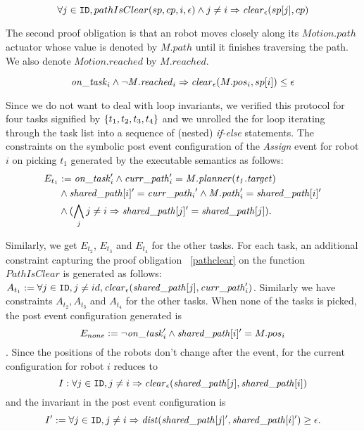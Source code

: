 \begin{proofob}
    \label{pathclear}
    $$\forall j \in \texttt{ID}, \mathit\mathit{pathIsClear}(sp, cp,  i, \epsilon) \wedge j \neq i \Rightarrow \mathit{clear}_\epsilon(sp[j], cp)$$
\end{proofob}


The second proof obligation is that an robot moves closely along its $\mathit{Motion.path}$ actuator whose value is denoted by $\mathit{M.path}$ until it finishes traversing the path. We also denote $\mathit{Motion.reached}$ by $\mathit{M.reached}$.
\begin{proofob}
        \label{stlinemotion}
    $$\mathit{on\_task}_i\wedge \neg \mathit{M.reached}_i \Rightarrow \mathit{clear}_\epsilon(M.pos_i, sp[i]) \leq \epsilon $$
\end{proofob}

Since we do not want to deal with loop invariants, we verified this protocol for four tasks signified by $\left\{t_1,t_2,t_3,t_4\right\}$ and we unrolled the for loop iterating through the task list into a sequence of (nested) \emph{if-else} statements. The constraints on the symbolic post event configuration of the \emph{Assign} event for robot $i$ on picking $t_1$ generated by the \K executable semantics as follows: \begin{align*}E_{t_1} &:= \mathit{on\_task}_i' \wedge \mathit{curr\_path}_i' = \mathit{M.planner(t_1.target)} \\ &\wedge \mathit{shared\_path}[i]' = \mathit{curr\_path_i}' \wedge \mathit{M.path}_i' = \mathit{shared\_path}[i]' \\
  &\wedge (\bigwedge_j j\neq i \Rightarrow \mathit{shared\_path}[j]'= \mathit{shared\_path}[j]).
 \end{align*}

Similarly, we get $E_{t_2}$, $E_{t_3}$ and $E_{t_4}$ for the other tasks. For each task, an additional constraint capturing the proof obligation ~\ref{pathclear} on the function $\mathit{PathIsClear}$ is generated as follows:  $A_{t_1} := \forall j \in \texttt{ID}, j \neq id, \mathit{clear}_\epsilon(\mathit{shared\_path}[j], \mathit{curr\_path}_i')$. Similarly we have constraints $A_{t_2}, A_{t_3}$  and $A_{t_4}$ for the other tasks. When none of the tasks is picked, the post event configuration generated is $$ E_{none} :=\neg\mathit{on\_task}_i' \wedge \mathit{shared\_path}[i]' = M.pos_i $$. Since the positions of the robots don't change after the event,  for the current configuration for robot $i$ reduces to $$I: \forall j \in \texttt{ID}, j \neq i \Rightarrow \mathit{clear}_\epsilon(\mathit{shared\_path}[j], \mathit{shared\_path}[i])$$ and the invariant in the post event configuration is $$I' := \forall j \in \texttt{ID}, j \neq i \Rightarrow \mathit{dist}(\mathit{shared\_path}[j]', \mathit{shared\_path}[i]') \geq \epsilon  .$$

